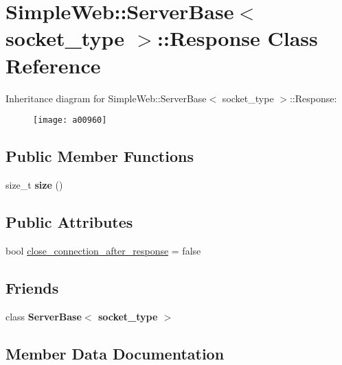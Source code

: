\hypertarget{a00960}{}\section{Simple\+Web\+:\+:Server\+Base$<$ socket\+\_\+type $>$\+:\+:Response Class Reference}
\label{a00960}
Inheritance diagram for Simple\+Web\+:\+:Server\+Base$<$ socket\+\_\+type $>$\+:\+:Response\+:\begin{figure}[H]
\begin{center}
\leavevmode
\texttt{[image: a00960]}
\end{center}
\end{figure}
\subsection*{Public Member Functions}
\begin{DoxyCompactItemize}
\item 
\mbox{\label{a00960_af666efb61621d70c16e3d6a6c419271d}} 
size\+\_\+t {\bfseries size} ()
\end{DoxyCompactItemize}
\subsection*{Public Attributes}
\begin{DoxyCompactItemize}
\item 
bool \hyperlink{a00960_a2818b4f3c577ff1f4067bb1c62640c15}{close\+\_\+connection\+\_\+after\+\_\+response} = false
\end{DoxyCompactItemize}
\subsection*{Friends}
\begin{DoxyCompactItemize}
\item 
\mbox{\label{a00960_a01d54a7e16ca437c98ec571deca98dfc}} 
class {\bfseries Server\+Base$<$ socket\+\_\+type $>$}
\end{DoxyCompactItemize}


\subsection{Member Data Documentation}
\mbox{\label{a00960_a2818b4f3c577ff1f4067bb1c62640c15}} 
